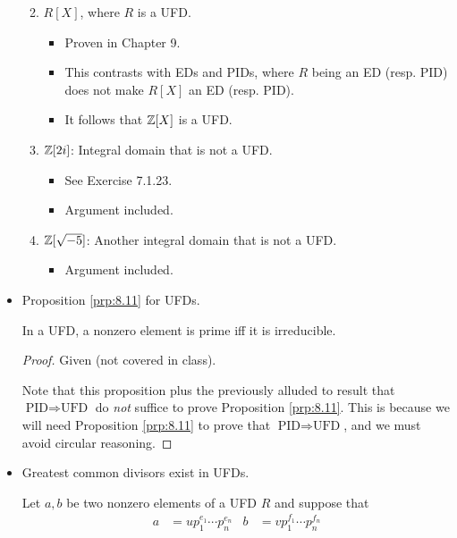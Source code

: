 \documentclass[../notes.tex]{subfiles}
\begin{document}
\begin{itemize}
\begin{enumerate}
\begin{itemize}
        \end{itemize}
        \item $R[X]$, where $R$ is a UFD.
        \begin{itemize}
            \item Proven in Chapter 9.
            \item This contrasts with EDs and PIDs, where $R$ being an ED (resp. PID) does not make $R[X]$ an ED (resp. PID).
            \item It follows that $\mathbb{Z}[X]$ is a UFD.
        \end{itemize}
        \item $\mathbb{Z}[2i]$: Integral domain that is not a UFD.
        \begin{itemize}
            \item See Exercise 7.1.23.
            \item Argument included.
        \end{itemize}
        \item $\mathbb{Z}[\sqrt{-5}]$: Another integral domain that is not a UFD.
        \begin{itemize}
            \item Argument included.
        \end{itemize}
    \end{enumerate}
    \item Proposition \ref{prp:8.11} for UFDs.
    \begin{proposition}\label{prp:8.12}
        In a UFD, a nonzero element is prime iff it is irreducible.
        \begin{proof}
            Given (not covered in class).\par
            Note that this proposition plus the previously alluded to result that $\text{PID}\Longrightarrow\text{UFD}$ do \emph{not} suffice to prove Proposition \ref{prp:8.11}. This is because we will need Proposition \ref{prp:8.11} to prove that $\text{PID}\Longrightarrow\text{UFD}$, and we must avoid circular reasoning.
        \end{proof}
    \end{proposition}
    \item Greatest common divisors exist in UFDs.
    \begin{proposition}\label{prp:8.13}
        Let $a,b$ be two nonzero elements of a UFD $R$ and suppose that
        \begin{align*}
            a &= up_1^{e_1}\cdots p_n^{e_n}&
            b &= vp_1^{f_1}\cdots p_n^{f_n}
        \end{align*}

\end{proposition}
\end{itemize}
\end{document}
